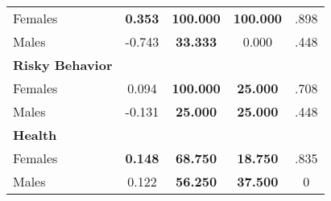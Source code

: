 \begin{tabular}{l c c c c}
\quad Females &  \textbf{    0.353} & \textbf{  100.000} & \textbf{  100.000} & .898 \\
\quad Males &     -0.743 & \textbf{   33.333} &     0.000 & .448 \\
\midrule
\textbf{Risky Behavior} & & & & \\
\quad Females &      0.094 & \textbf{  100.000} & \textbf{   25.000} & .708 \\
\quad Males &     -0.131 & \textbf{   25.000} & \textbf{   25.000} & .448 \\
\midrule
\textbf{Health} & & & & \\
\quad Females &  \textbf{    0.148} & \textbf{   68.750} & \textbf{   18.750} & .835 \\
\quad Males &      0.122 & \textbf{   56.250} & \textbf{   37.500} & 0 \\
\bottomrule
\end{tabular}
